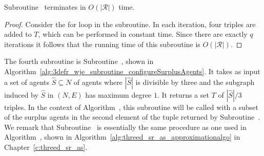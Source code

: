 \begin{lem}
\label{lem:threed_efr_as_wjenvy_max_degree_2_subroutine_oneC4TwoSingles_running_time}
Subroutine~ terminates in $O(|\mathcal{R}|)$ time.
\end{lem}
\begin{proof}
Consider the for loop in the subroutine. In each iteration, four triples are added to $T$, which can be performed in constant time. Since there are exactly $q$ iterations it follows that the running time of this subroutine is $O(|\mathcal{R}|)$.
\end{proof}

The fourth subroutine is Subroutine~, shown in Algorithm~\ref{alg:3defr_wje_subroutine_configureSurplusAgents}. It takes as input a set of agents $\hat{S} \subseteq N$ of agents where $|\hat{S}|$ is divisible by three and the subgraph induced by $\hat{S}$ in $(N, E)$ has maximum degree $1$. It returns a set $T$ of $|\hat{S}|/3$ triples. In the context of Algorithm~, this subroutine will be called with a subset of the surplus agents in the second element of the tuple returned by Subroutine~. We remark that Subroutine~ is essentially the same procedure as one used in Algorithm~, shown in Algorithm~\ref{alg:threed_sr_as_approximationalgo} in Chapter~\ref{c:threed_sr_as}.



